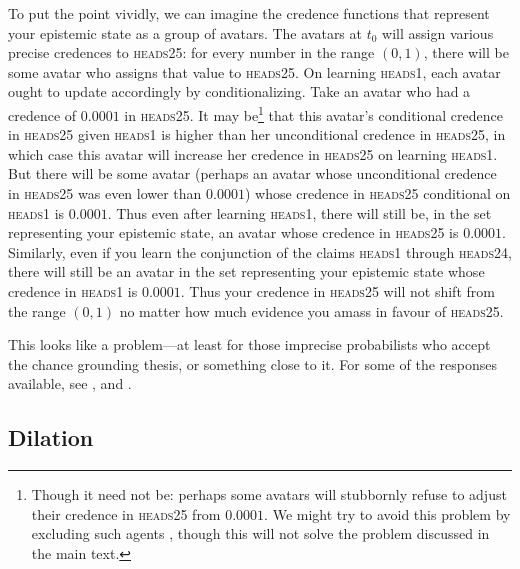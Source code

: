 To put the point vividly, we can imagine the credence functions that represent your epistemic state as a group of avatars. The avatars at $t_0$ will assign various precise credences to \textsc{heads25}: for every number in the range $(0,1)$, there will be some avatar who assigns that value to \textsc{heads25}. On learning \textsc{heads1}, each avatar ought to update accordingly by conditionalizing. Take an avatar who had a credence of $0.0001$ in \textsc{heads25}. It may be\footnote{Though it need not be: perhaps some avatars will stubbornly refuse to adjust their credence in \textsc{heads25} from $0.0001$. We might try to avoid this problem by excluding such agents \citep{halpern2003}, though this will not solve the problem discussed in the main text.} that this avatar's conditional credence in \textsc{heads25} given \textsc{heads1} is higher than her unconditional credence in \textsc{heads25}, in which case this avatar will increase her credence in \textsc{heads25} on learning \textsc{heads1}. But there will be some avatar (perhaps an avatar whose unconditional credence in \textsc{heads25} was even lower than $0.0001$) whose credence in \textsc{heads25} conditional on \textsc{heads1} is $0.0001$. Thus even after learning \textsc{heads1}, there will still be, in the set representing your epistemic state, an avatar whose credence in \textsc{heads25} is $0.0001$. Similarly, even if you learn the conjunction of the claims \textsc{heads1} through \textsc{heads24}, there will still be an avatar in the set representing your epistemic state whose credence in \textsc{heads1} is $0.0001$. Thus your credence in \textsc{heads25} will not shift from the range $(0,1)$ no matter how much evidence you amass in favour of \textsc{heads25}.  

This looks like a problem---at least for those imprecise probabilists who accept the chance grounding thesis, or something close to it. For some of the responses available, see \citet{bradleyMS,Joyce2010,rinard2013}, and \citet{vallinderMS}. 


\subsection{Dilation}

